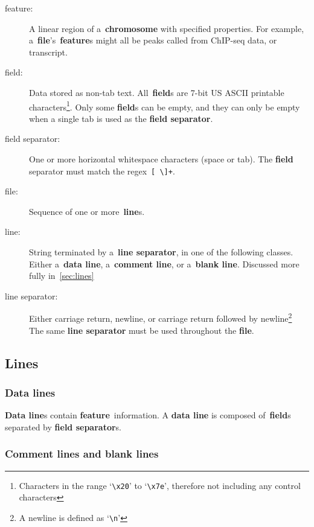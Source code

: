 \documentclass[11pt]{article}
\begin{document}
\begin{description}
\item[feature:]
  A linear region of a~\textbf{chromosome} with specified properties.
  For example, a~\textbf{file}'s~\textbf{feature}s might all be peaks called from ChIP-seq data, or transcript.

\item[field:]
  Data stored as non-tab text.
  All~\textbf{field}s are 7-bit US \ac{ASCII} printable characters\footnote{Characters in the range `\texttt{{\textbackslash}x20}' to `\texttt{{\textbackslash}x7e}', therefore not including any control characters}.
  Only some \textbf{field}s can be empty, and they can only be empty when a single tab is used as the \textbf{field separator}.

\item[field separator:]
  One or more horizontal whitespace characters (space or tab).
  The \textbf{field} separator must match the \ac{regex}~\texttt{[ {\textbackslash}]+}.

\item[file:]
  Sequence of one or more~\textbf{line}s.

\item[line:]
  String terminated by a~\textbf{line separator}, in one of the following classes.
  Either a~\textbf{data line}, a~\textbf{comment line}, or a~\textbf{blank line}.
  Discussed more fully in~\autoref{sec:lines}

\item[line separator:]
  Either carriage return, newline, or carriage return followed by newline\footnote{A newline is defined as `\texttt{{\textbackslash}n}'}
  The same \textbf{line separator} must be used throughout the \textbf{file}.
\end{description}

\subsection{Lines}\label{sec:lines}

\subsubsection{Data lines}

\textbf{Data line}s contain \textbf{feature}~information.
A \textbf{data line} is composed of~\textbf{field}s separated by \textbf{field separator}s.

\subsubsection{Comment lines and blank lines}
\end{document}
